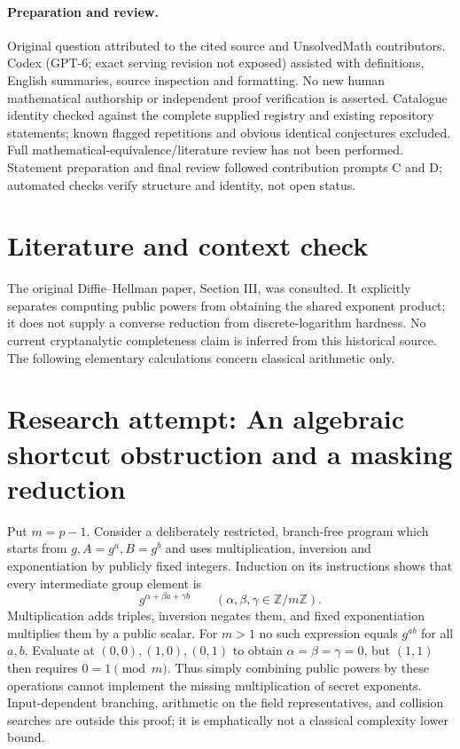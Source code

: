 \documentclass[11pt]{article}
\begin{document}
\paragraph{Preparation and review.}
Original question attributed to the cited source and UnsolvedMath contributors. Codex (GPT-6; exact serving revision not exposed) assisted with definitions, English summaries, source inspection and formatting. No new human mathematical authorship or independent proof verification is asserted. Catalogue identity checked against the complete supplied registry and existing repository statements; known flagged repetitions and obvious identical conjectures excluded. Full mathematical-equivalence/literature review has not been performed. Statement preparation and final review followed contribution prompts C and D; automated checks verify structure and identity, not open status.
\label{end:statement}

\section{Literature and context check}
The original Diffie--Hellman paper, Section III, was consulted. It explicitly
separates computing public powers from obtaining the shared exponent product;
it does not supply a converse reduction from discrete-logarithm hardness. No
current cryptanalytic completeness claim is inferred from this historical source.
The following elementary calculations concern classical arithmetic only.
\section{Research attempt: An algebraic shortcut obstruction and a masking reduction}
Put $m=p-1$. Consider a deliberately restricted, branch-free program which
starts from $g,A=g^a,B=g^b$ and uses multiplication, inversion and exponentiation
by publicly fixed integers. Induction on its instructions shows that every
intermediate group element is
\[
 g^{\alpha+\beta a+\gamma b}\qquad(\alpha,\beta,\gamma\in\mathbb Z/m\mathbb Z).
\]
Multiplication adds triples, inversion negates them, and fixed exponentiation
multiplies them by a public scalar. For $m>1$ no such expression equals $g^{ab}$
for all $a,b$. Evaluate at $(0,0),(1,0),(0,1)$ to obtain
$\alpha=\beta=\gamma=0$, but $(1,1)$ then requires $0=1\pmod m$.
Thus simply combining public powers by these operations cannot implement the
missing multiplication of secret exponents. Input-dependent branching, arithmetic
on the field representatives, and collision searches are outside this proof;
it is emphatically not a classical complexity lower bound.
\end{document}
